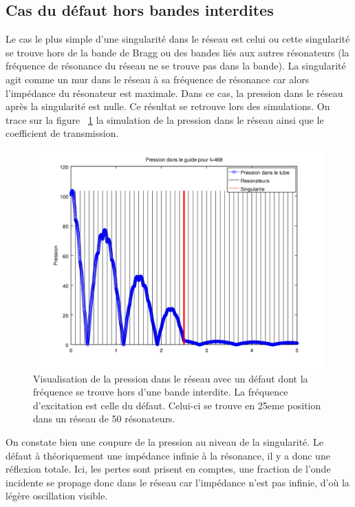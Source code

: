 




\subsection{Cas du défaut hors bandes interdites}
Le cas le plus simple d'une singularité dans le réseau est celui ou cette singularité se trouve hors de la bande de Bragg ou des bandes liés aux autres résonateurs (la fréquence de résonance du réseau ne se trouve pas dans la bande). La singularité agit comme un mur dans le réseau à sa fréquence de résonance car alors l'impédance du résonateur est maximale. Dans ce cas, la pression dans le réseau après la singularité est nulle. Ce résultat se retrouve lors des simulations. On trace sur la figure ~\ref{defaut_hb} la simulation de la pression dans le réseau ainsi que le coefficient de transmission.


\begin{figure}[!h]
\centering
\includegraphics[scale=0.5]{images_chp2/visu_pression_defavo.png}
\caption{\label{defaut_hb} Visualisation de la pression dans le réseau avec un défaut dont la fréquence se trouve hors d'une bande interdite. La fréquence d'excitation est celle du défaut. Celui-ci se trouve en 25eme position dans un réseau de 50 résonateurs.}
\end{figure}

\bigskip
On constate bien une coupure de la pression au niveau de la singularité. Le défaut à théoriquement une impédance infinie à la résonance, il y a donc une réflexion totale. Ici, les pertes sont prisent en comptes, une fraction de l'onde incidente se propage donc dans le réseau car l'impédance n'est pas infinie, d'où la légère oscillation visible.




